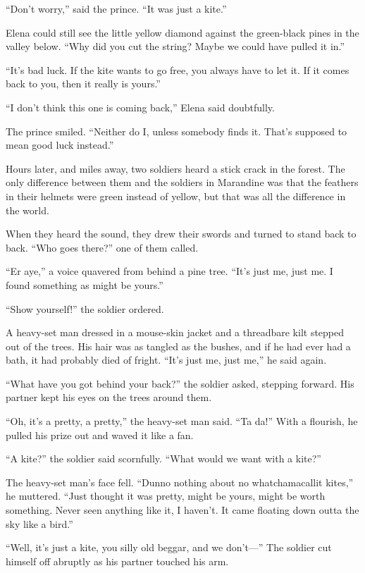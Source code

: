 \documentclass[10pt]{book}
\begin{document}
``Don't worry,'' said the prince. ``It was just a kite.''

Elena could still see the little yellow diamond against the green-black pines in the valley below. ``Why did you cut the string? Maybe we could have pulled it in.''

``It's bad luck. If the kite wants to go free, you always have to let it. If it comes back to you, then it really is yours.''

``I don't think this one is coming back,'' Elena said doubtfully.

The prince smiled. ``Neither do I, unless somebody finds it. That's supposed to mean good luck instead.''

Hours later, and miles away, two soldiers heard a stick crack in the forest. The only difference between them and the soldiers in Marandine was that the feathers in their helmets were green instead of yellow, but that was all the difference in the world.

When they heard the sound, they drew their swords and turned to stand back to back. ``Who goes there?'' one of them called.

``Er aye,'' a voice quavered from behind a pine tree. ``It's just me, just me. I found something as might be yours.''

``Show yourself!'' the soldier ordered.

A heavy-set man dressed in a mouse-skin jacket and a threadbare kilt stepped out of the trees. His hair was as tangled as the bushes, and if he had ever had a bath, it had probably died of fright. ``It's just me, just me,'' he said again.

``What have you got behind your back?'' the soldier asked, stepping forward. His partner kept his eyes on the trees around them.

``Oh, it's a pretty, a pretty,'' the heavy-set man said. ``Ta da!'' With a flourish, he pulled his prize out and waved it like a fan.

``A kite?'' the soldier said scornfully. ``What would we want with a kite?''

The heavy-set man's face fell. ``Dunno nothing about no whatchamacallit kites,'' he muttered. ``Just thought it was pretty, might be yours, might be worth something. Never seen anything like it, I haven't. It came floating down outta the sky like a bird.''

``Well, it's just a kite, you silly old beggar, and we don't---'' The soldier cut himself off abruptly as his partner touched his arm.
\end{document}
